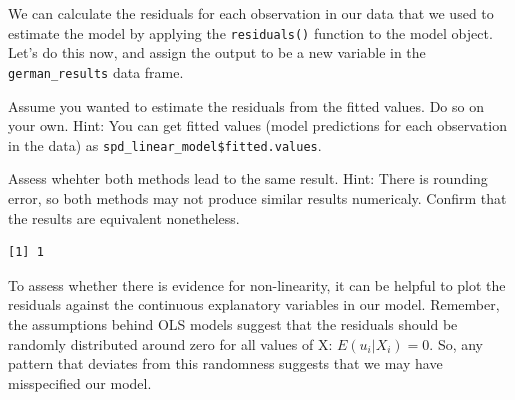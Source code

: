 \documentclass[]{article}
\newenvironment{Shaded}{\begin{snugshade}}{\end{snugshade}}
\newcommand{\KeywordTok}[1]{\textcolor[rgb]{0.13,0.29,0.53}{\textbf{#1}}}
\newcommand{\StringTok}[1]{\textcolor[rgb]{0.31,0.60,0.02}{#1}}
\newcommand{\CommentTok}[1]{\textcolor[rgb]{0.56,0.35,0.01}{\textit{#1}}}
\newcommand{\OperatorTok}[1]{\textcolor[rgb]{0.81,0.36,0.00}{\textbf{#1}}}
\newcommand{\NormalTok}[1]{#1}
\theoremstyle{definition}
\theoremstyle{definition}
\theoremstyle{definition}
\theoremstyle{remark}
\begin{document}
We can calculate the residuals for each observation in our data that we
used to estimate the model by applying the \texttt{residuals()} function
to the model object. Let's do this now, and assign the output to be a
new variable in the \texttt{german\_results} data frame.

\begin{Shaded}
\end{Shaded}

Assume you wanted to estimate the residuals from the fitted values. Do
so on your own. Hint: You can get fitted values (model predictions for
each observation in the data) as
\texttt{spd\_linear\_model\$fitted.values}.

\begin{Shaded}
\end{Shaded}

Assess whehter both methods lead to the same result. Hint: There is
rounding error, so both methods may not produce similar results
numericaly. Confirm that the results are equivalent nonetheless.

\begin{Shaded}
\end{Shaded}

\begin{verbatim}
[1] 1
\end{verbatim}

To assess whether there is evidence for non-linearity, it can be helpful
to plot the residuals against the continuous explanatory variables in
our model. Remember, the assumptions behind OLS models suggest that the
residuals should be randomly distributed around zero for all values of
X: \(E(u_i|X_i) = 0\). So, any pattern that deviates from this
randomness suggests that we may have misspecified our model.
\end{document}

